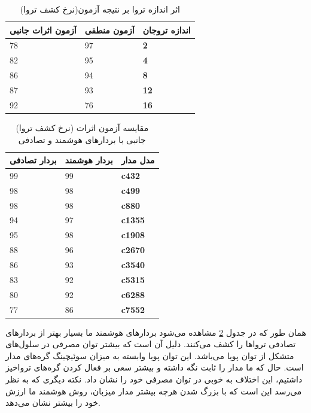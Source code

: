 	 \begin{table}[t]
	 \label{tsize}
\begin{center}

    \begin{tabular}{| p{4cm} | p{4cm} |p{1cm}|}

    \hline
    \textbf{ آزمون اثرات جانبی} & \textbf{ آزمون منطقی} & \textbf{اندازه تروجان}\\ \hline \hline
    78 & 97 &\textbf{2}  \\ \hline
   82 & 95 &\textbf{4}  \\ \hline
   86 & 94 &\textbf{8}  \\ \hline
   87 & 93 &\textbf{12}  \\ \hline
   92 & 76 &\textbf{16}  \\ \hline
     
    \end{tabular}
    \caption{(نرخ کشف تروا)اثر اندازه تروا بر نتیجه آزمون}

\end{center}
\end{table}


	 \begin{table}[t]
	 \label{tsideivectors}
\begin{center}

    \begin{tabular}{| p{4cm} | p{4cm} |p{2cm}|}

    \hline
    \textbf{ بردار تصادفی} & \textbf{ بردار هوشمند} & \textbf{مدل مدار} \\ \hline \hline
    99 & 99 &\textbf{c432}  \\ \hline
   98 & 98 &\textbf{c499}  \\ \hline
   98 & 98 &\textbf{c880}  \\ \hline
    94 & 97 &\textbf{c1355}  \\ \hline
     95 & 98 &\textbf{c1908}  \\ \hline
      88 & 96 &\textbf{c2670}  \\ \hline
       86 & 93 &\textbf{c3540}  \\ \hline
 83 & 92 &\textbf{c5315}  \\ \hline
 80 & 92 &\textbf{c6288}  \\ \hline
  77 & 86 &\textbf{c7552}  \\ \hline     

    \end{tabular}
\caption{(نرخ کشف تروا) مقایسه آزمون اثرات جانبی با بردارهای هوشمند و تصادفی}

\end{center}
\end{table}
همان طور که در جدول \ref{tsideivectors} مشاهده می‌شود بردارهای هوشمند ما بسیار بهتر از بردارهای تصادفی تروا‌ها را کشف می‌کنند. دلیل آن است که بیشتر توان مصرفی در سلول‌های
 متشکل از توان پویا می‌باشد. این توان پویا وابسته به میزان سوئیچینگ گره‌های مدار است. حال که ما مدار را ثابت نگه داشته و بیشتر سعی بر فعال کردن گره‌های تروا‌خیز داشتیم، این اختلاف به خوبی در توان مصرفی خود را نشان داد.  نکته دیگری که به نظر می‌رسد این است که با بزرگ شدن هرچه بیشتر مدار میزبان، روش هوشمند ما ارزش خود را بیشتر نشان می‌دهد.

